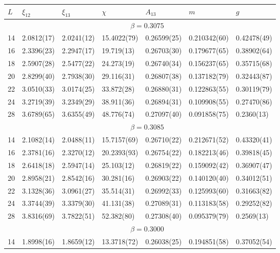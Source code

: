 \documentclass[12pt]{article}
\begin{document}
\begin{table}
\begin{center}
{
\tiny
\begin{tabular}{|l|l|l|l|l|l|l|}
 \hline 
 \hfil $L$ \hfil &  \hfil $\xi_{12}$ \hfil & \hfil $\xi_{13}$ \hfil & \hfil 
  $\chi$ \hfil & \hfil $A_{13}$ \hfil & \hfil $m$ \hfil & \hfil $g$ \hfil  \\ 
 \hline 
  & \multicolumn{6}{|c|}{$ \beta = 0.3075 $} \\ 
 \hline 
14 & 2.0812(17) & 2.0241(12) & 15.4022(79) & 0.26599(25) & 0.210342(60) & 0.42478(49)\\ 
16 & 2.3396(23) & 2.2947(17) & 19.719(13) & 0.26703(30) & 0.179677(65) & 0.38902(64)\\ 
18 & 2.5907(28) & 2.5477(22) & 24.273(19) & 0.26740(34) & 0.156237(65) & 0.35715(68)\\ 
20 & 2.8299(40) & 2.7938(30) & 29.116(31) & 0.26807(38) & 0.137182(79) & 0.32443(87)\\ 
22 & 3.0510(33) & 3.0174(25) & 33.872(28) & 0.26880(31) & 0.122863(55) & 0.30119(79)\\ 
24 & 3.2719(39) & 3.2349(29) & 38.911(36) & 0.26894(31) & 0.109908(55) & 0.27470(86)\\ 
28 & 3.6789(65) & 3.6355(49) & 48.776(74) & 0.27097(40) & 0.091858(75) & 0.2360(13)\\ 
\hline 
  & \multicolumn{6}{|c|}{$ \beta = 0.3085 $} \\ 
 \hline 
14 & 2.1082(14) & 2.0488(11) & 15.7157(69) & 0.26710(22) & 0.212671(52) & 0.43320(41)\\ 
16 & 2.3781(16) & 2.3270(12) & 20.2393(93) & 0.26754(22) & 0.182213(46) & 0.39818(45)\\ 
18 & 2.6418(18) & 2.5947(14) & 25.103(12) & 0.26819(22) & 0.159092(42) & 0.36907(47)\\ 
20 & 2.8958(21) & 2.8542(16) & 30.281(16) & 0.26903(22) & 0.140120(40) & 0.34012(51)\\ 
22 & 3.1328(36) & 3.0961(27) & 35.514(31) & 0.26992(33) & 0.125993(60) & 0.31663(82)\\ 
24 & 3.3744(39) & 3.3379(30) & 41.131(38) & 0.27089(31) & 0.113183(58) & 0.29252(82)\\ 
28 & 3.8316(69) & 3.7822(51) & 52.382(80) & 0.27308(40) & 0.095379(79) & 0.2569(13)\\ 
\hline 
  & \multicolumn{6}{|c|}{$ \beta = 0.3000 $} \\ 
 \hline 
14 & 1.8998(16) & 1.8659(12) & 13.3718(72) & 0.26038(25) & 0.194851(58) & 0.37052(54)\\ 

\end{tabular}}
\end{center}
\end{table}
\end{document}
